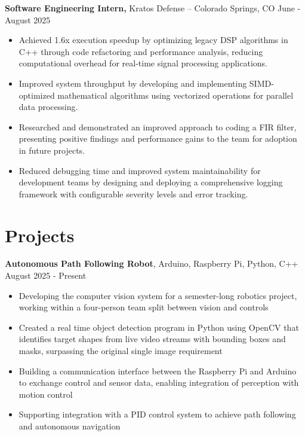 \documentclass[11pt]{article}
\begin{document}
\textbf{Software Engineering Intern, }{Kratos Defense} -- Colorado Springs, CO \hfill June - August 2025 \\
\begin{itemize}
  \item Achieved 1.6x execution speedup by optimizing legacy DSP algorithms in C++ through code refactoring and performance analysis, reducing computational overhead for real-time signal processing applications.
  \item Improved system throughput by developing and implementing SIMD-optimized mathematical algorithms using vectorized operations for parallel data processing.
  \item Researched and demonstrated an improved approach to coding a FIR filter, presenting positive findings and performance gains to the team for adoption in future projects.
  \item Reduced debugging time and improved system maintainability for development teams by designing and deploying a comprehensive logging framework with configurable severity levels and error tracking.
\end{itemize}

\section*{Projects}

\textbf{Autonomous Path Following Robot}, Arduino, Raspberry Pi, Python, C++  \hfill August 2025 - Present
\begin{itemize}
  \item Developing the computer vision system for a semester-long robotics project, working within a four-person team split between vision and controls
  \item Created a real time object detection program in Python using OpenCV that identifies target shapes from live video streams with bounding boxes and masks, surpassing the original single image requirement
  \item Building a communication interface between the Raspberry Pi and Arduino to exchange control and sensor data, enabling integration of perception with motion control
  \item Supporting integration with a PID control system to achieve path following and autonomous navigation
\end{itemize}

\vspace{3pt}
\end{document}

